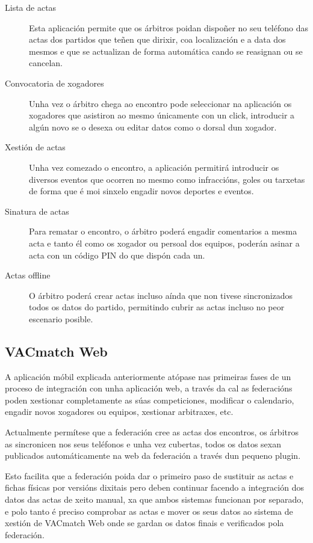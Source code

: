   \begin{description}
    \item [Lista de actas]
    Esta aplicación permite que os árbitros poidan dispoñer no seu teléfono 
das actas dos partidos que teñen que dirixir, coa localización e a data dos 
mesmos e que se actualizan de forma automática cando se reasignan ou se 
cancelan.

    \item [Convocatoria de xogadores]
    Unha vez o árbitro chega ao encontro pode seleccionar na aplicación os 
xogadores que asistiron ao mesmo únicamente con un click, introducir a algún 
novo se o desexa ou editar datos como o dorsal dun xogador.

    \item [Xestión de actas]
    Unha vez comezado o encontro, a aplicación permitirá introducir os diversos 
eventos que ocorren no mesmo como infraccións, goles ou tarxetas de forma que é 
moi sinxelo engadir novos deportes e eventos.

    \item [Sinatura de actas]
    Para rematar o encontro, o árbitro poderá engadir comentarios a mesma acta 
e tanto él como os xogador ou persoal dos equipos, poderán asinar a acta con un 
código PIN do que dispón cada un.

    \item [Actas offline]
    O árbitro poderá crear actas incluso aínda que non tivese sincronizados 
todos os datos do partido, permitindo cubrir as actas incluso no peor escenario 
posible.

  \end{description} 

    \subsection{VACmatch Web}
    A aplicación móbil explicada anteriormente atópase nas primeiras fases de 
un proceso de integración con unha aplicación web, a través da cal as 
federacións poden xestionar completamente as súas competiciones, modificar o 
calendario, engadir novos xogadores ou equipos, xestionar arbitraxes, etc.

    Actualmente permítese que a federación cree as actas dos encontros, os 
árbitros as sincronicen nos seus teléfonos e unha vez cubertas, todos os datos 
sexan publicados automáticamente na web da federación a través dun pequeno 
plugin.

    Esto facilita que a federación poida dar o primeiro paso de sustituir as 
actas e fichas físicas por versións dixitais pero deben continuar facendo a 
integración dos datos das actas de xeito manual, xa que ambos sistemas funcionan 
por separado, e polo tanto é preciso comprobar as actas e mover os seus datos 
ao sistema de xestión de VACmatch Web onde se gardan os datos finais e 
verificados pola federación.

